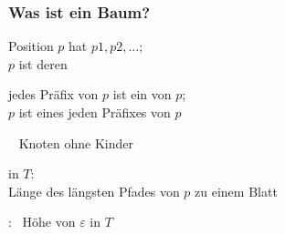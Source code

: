     \begin{frame}%
      \frametitle{Was ist ein Baum?}
      
      \par\medskip
      \begin{Itemize}
        \item
          Position $p$ hat  $p1,p2,\dots$;\\
          $p$ ist deren  
          \par\smallskip
        \item
          jedes Präfix von $p$ ist ein  von $p$; \\
          $p$ ist  eines jeden Präfixes von $p$
          \par\smallskip
        \item
          ~ Knoten ohne Kinder
          \par\smallskip
        \item
           in $T$:\\
          Länge des längsten Pfades von $p$ zu einem Blatt
          \par\smallskip
        \item
          :~ Höhe von $\varepsilon$ in $T$
      \end{Itemize}

    \end{frame}

